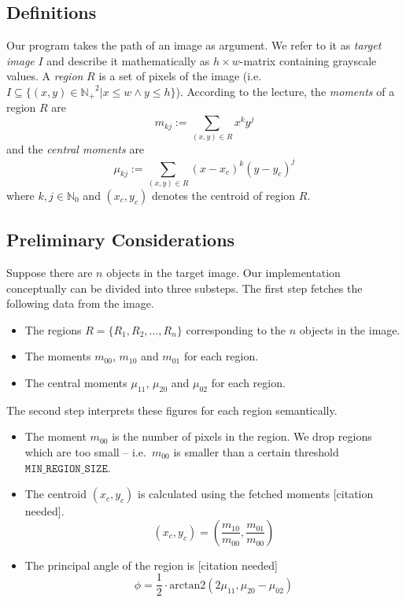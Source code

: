 \documentclass[letter,12pt]{article}
\begin{document}
\subsection{Definitions}
Our program takes the path of an image as argument. We refer to it as {\em target image} $I$ and describe it mathematically as $h\times w$-matrix containing grayscale values. A {\em region} $R$ is a set of pixels of the image (i.e.\ $I\subseteq \{(x,y)\in {\mathbb{N}_+}^2| x \leq w \land y\leq h\}$). According to the lecture, the {\em moments} of a region $R$ are
\begin{equation*}
m_{kj} := \sum_{(x,y)\in R} x^ky^j
\end{equation*}
and the {\em central moments} are
\begin{equation*}
\mu_{kj} := \sum_{(x,y)\in R} {(x-x_c)}^k{(y-y_c)}^j
\end{equation*}
where $k,j\in \mathbb{N}_0$ and $(x_c, y_c)$ denotes the centroid of region $R$.

\subsection{Preliminary Considerations}
Suppose there are $n$ objects in the target image. Our implementation conceptually can be divided into three substeps. The first step fetches the following data from the image.

\begin{itemize}
\item The regions $R = \{R_1, R_2,\ldots, R_n\}$ corresponding to the $n$ objects in the image.
\item The moments $m_{00}$, $m_{10}$ and $m_{01}$ for each region.
\item The central moments $\mu_{11}$, $\mu_{20}$ and $\mu_{02}$ for each region.
\end{itemize}

The second step interprets these figures for each region semantically.

\begin{itemize}
\item The moment $m_{00}$ is the number of pixels in the region. We drop regions which are too small -- i.e.\ $m_{00}$ is smaller than a certain threshold $\mathtt{MIN\_REGION\_SIZE}$.
\item The centroid $(x_c,y_c)$ is calculated using the fetched moments [citation needed].
\begin{equation*}
(x_c,y_c) = (\frac{m_{10}}{m_{00}},\frac{m_{01}}{m_{00}})
\end{equation*}
\item The principal angle of the region is [citation needed]
\begin{equation*}
\phi = \frac{1}{2}\cdot \text{arctan2}(2\mu_{11},\mu_{20}-\mu_{02})
\end{equation*}
\end{itemize}
\end{document}
